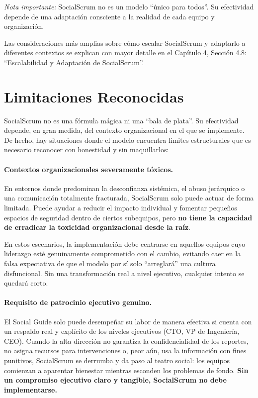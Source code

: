 \emph{Nota importante:} SocialScrum no es un modelo ``único para todos''.
Su efectividad depende de una adaptación consciente a la realidad de cada equipo y organización.

Las consideraciones más amplias sobre cómo escalar SocialScrum y adaptarlo a diferentes contextos se explican con mayor detalle en el Capítulo 4, Sección 4.8: ``Escalabilidad y Adaptación de SocialScrum''.

\section{Limitaciones Reconocidas}

SocialScrum no es una fórmula mágica ni una ``bala de plata''.
Su efectividad depende, en gran medida, del contexto organizacional en el que se implemente. De hecho, hay situaciones donde el modelo encuentra límites estructurales que es necesario reconocer con honestidad y sin maquillarlos:

\paragraph{Contextos organizacionales severamente tóxicos.}
En entornos donde predominan la desconfianza sistémica, el abuso jerárquico o una comunicación totalmente fracturada, SocialScrum solo puede actuar de forma limitada. Puede ayudar a reducir el impacto individual y fomentar pequeños espacios de seguridad dentro de ciertos subequipos, pero \textbf{no tiene la capacidad de erradicar la toxicidad organizacional desde la raíz}.

En estos escenarios, la implementación debe centrarse en aquellos equipos cuyo liderazgo esté genuinamente comprometido con el cambio, evitando caer en la falsa expectativa de que el modelo por sí solo ``arreglará'' una cultura disfuncional. Sin una transformación real a nivel ejecutivo, cualquier intento se quedará corto.

\paragraph{Requisito de patrocinio ejecutivo genuino.}
El Social Guide solo puede desempeñar su labor de manera efectiva si cuenta con un respaldo real y explícito de los niveles ejecutivos (CTO, VP de Ingeniería, CEO). Cuando la alta dirección no garantiza la confidencialidad de los reportes, no asigna recursos para intervenciones o, peor aún, usa la información con fines punitivos, SocialScrum se derrumba y da paso al teatro social: los equipos comienzan a aparentar bienestar mientras esconden los problemas de fondo.
\textbf{Sin un compromiso ejecutivo claro y tangible, SocialScrum no debe implementarse.}

